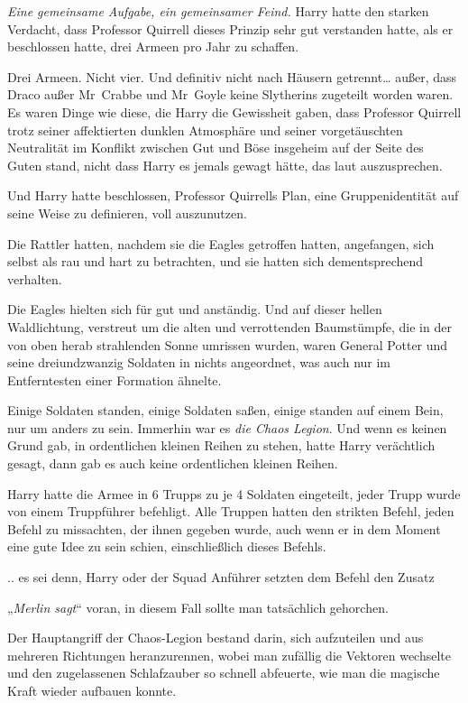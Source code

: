{\emph{Eine gemeinsame Aufgabe, ein gemeinsamer Feind.} Harry hatte den starken Verdacht, dass Professor Quirrell dieses Prinzip sehr gut verstanden hatte, als er beschlossen hatte, drei Armeen pro Jahr zu schaffen.

Drei Armeen. Nicht vier. Und definitiv nicht nach Häusern getrennt… außer, dass Draco außer Mr~Crabbe und Mr~Goyle keine Slytherins zugeteilt worden waren. Es waren Dinge wie diese, die Harry die Gewissheit gaben, dass Professor Quirrell trotz seiner affektierten dunklen Atmosphäre und seiner vorgetäuschten Neutralität im Konflikt zwischen Gut und Böse insgeheim auf der Seite des Guten stand, nicht dass Harry es jemals gewagt hätte, das laut auszusprechen.

Und Harry hatte beschlossen, Professor Quirrells Plan, eine Gruppenidentität auf seine Weise zu definieren, voll auszunutzen.

Die Rattler hatten, nachdem sie die Eagles getroffen hatten, angefangen, sich selbst als rau und hart zu betrachten, und sie hatten sich dementsprechend verhalten.

Die Eagles hielten sich für gut und anständig. Und auf dieser hellen Waldlichtung, verstreut um die alten und verrottenden Baumstümpfe, die in der von oben herab strahlenden Sonne umrissen wurden, waren General Potter und seine dreiundzwanzig Soldaten in nichts angeordnet, was auch nur im Entferntesten einer Formation ähnelte.

Einige Soldaten standen, einige Soldaten saßen, einige standen auf einem Bein, nur um anders zu sein. Immerhin war es \emph{die Chaos Legion}. Und wenn es keinen Grund gab, in ordentlichen kleinen Reihen zu stehen, hatte Harry verächtlich gesagt, dann gab es auch keine ordentlichen kleinen Reihen.

Harry hatte die Armee in 6 Trupps zu je 4 Soldaten eingeteilt, jeder Trupp wurde von einem Truppführer befehligt. Alle Truppen hatten den strikten Befehl, jeden Befehl zu missachten, der ihnen gegeben wurde, auch wenn er in dem Moment eine gute Idee zu sein schien, einschließlich dieses Befehls.

.. es sei denn, Harry oder der Squad Anführer setzten dem Befehl den Zusatz

„\emph{Merlin sagt}“ voran, in diesem Fall sollte man tatsächlich gehorchen.

Der Hauptangriff der Chaos-Legion bestand darin, sich aufzuteilen und aus mehreren Richtungen heranzurennen, wobei man zufällig die Vektoren wechselte und den zugelassenen Schlafzauber so schnell abfeuerte, wie man die magische Kraft wieder aufbauen konnte.

}
